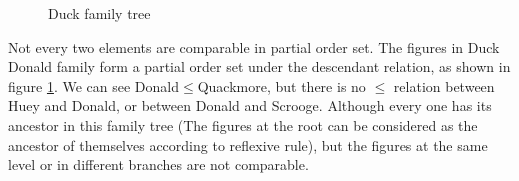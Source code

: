 \documentclass[b5paper]{article}
\begin{document}
\begin{figure}[htbp]
\centering
{}
\caption{Duck family tree}
\label{fig:genealogical-tree}
\end{figure}

Not every two elements are comparable in partial order set. The figures in Duck Donald family form a partial order set under the descendant relation, as shown in figure \ref{fig:genealogical-tree}. We can see Donald$\leq$Quackmore, but there is no $\leq$ relation between Huey and Donald, or between Donald and Scrooge. Although every one has its ancestor in this family tree (The figures at the root can be considered as the ancestor of themselves according to reflexive rule), but the figures at the same level or in different branches are not comparable.
\end{document}
